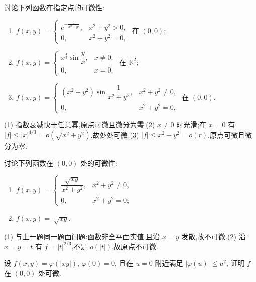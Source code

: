 \begin{example}
    讨论下列函数在指定点的可微性:
    \begin{enumerate}
        \item $\displaystyle f(x,y)=\begin{cases}e^{-\frac{1}{x^2+y^2}},&x^2+y^2>0,\\0,&x^2+y^2=0,\end{cases}$ 在 $(0,0)$;
        \item $\displaystyle f(x,y)=\begin{cases}x^{\frac{4}{3}}\sin\dfrac{y}{x},&x\ne0,\\0,&x=0,\end{cases}$ 在 $\mathbb{R}^2$;
        \item $\displaystyle f(x,y)=\begin{cases}(x^2+y^2)\sin\dfrac{1}{x^2+y^2},&x^2+y^2\ne0,\\0,&x^2+y^2=0,\end{cases}$ 在 $(0,0)$.
    \end{enumerate}
\end{example}
\exampleblank

\begin{solution}

    (1) 指数衰减快于任意幂,原点可微且微分为零.(2) $x\ne0$ 时光滑;在 $x=0$ 有 $|f|\leq|x|^{4/3}=o(\sqrt{x^2+y^2})$,故处处可微.(3) $|f|\leq x^2+y^2=o(r)$,原点可微且微分为零.
\end{solution}

\begin{example}
    讨论下列函数在 $(0,0)$ 处的可微性:
    \begin{enumerate}
        \item $\displaystyle f(x,y)=\begin{cases}\dfrac{\sqrt{xy}}{x^2+y^2},&x^2+y^2\ne0,\\0,&x^2+y^2=0;\end{cases}$
        \item $f(x,y)=\sqrt[3]{xy}$.
    \end{enumerate}
\end{example}
\exampleblank

\begin{solution}

    (1) 与上一题同一题面问题:函数非全平面实值,且沿 $x=y$ 发散,故不可微.(2) 沿 $x=y=t$ 有 $f=|t|^{2/3}$,不是 $o(|t|)$,故原点不可微.
\end{solution}

\begin{example}
    设 $f(x,y)=\varphi(|xy|)$, $\varphi(0)=0$, 且在 $u=0$ 附近满足 $|\varphi(u)|\leq u^2$, 证明 $f$ 在 $(0,0)$ 处可微.
\end{example}
\exampleblank

